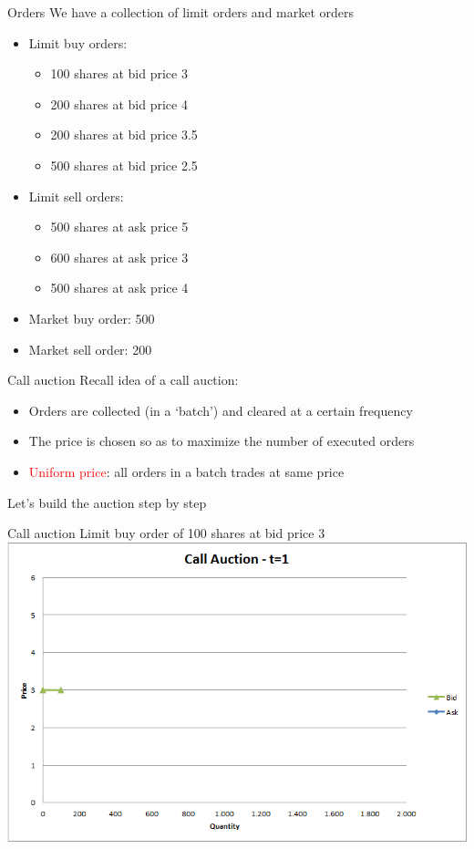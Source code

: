 \begin{frame}{Orders}
	We have a collection of limit orders and market orders
	\begin{itemize}
		\item Limit buy orders:
		\begin{itemize}
			\item 100 shares at bid price 3
			\item 200 shares at bid price 4
			\item 200 shares at bid price 3.5
			\item 500 shares at bid price 2.5
		\end{itemize}
		\item Limit sell orders:
		\begin{itemize}
			\item 500 shares at ask price 5
			\item 600 shares at ask price 3
			\item 500 shares at ask price 4
		\end{itemize}
		\item Market buy order: 500
		\item Market sell order: 200
	\end{itemize}
\end{frame}


\begin{frame}{Call auction}
	Recall idea of a call auction:
	\begin{itemize}
		\item Orders are collected (in a `batch') and cleared at a certain frequency
		\item The price is chosen so as to maximize the number of executed orders
		\item \textcolor{red}{Uniform price}: all orders in a batch trades at same price
	\end{itemize}
	\quad
	Let's build the auction step by step
\end{frame}


\begin{frame}{Call auction}
	Limit buy order of 100 shares at bid price 3
	\quad
	\center
	\includegraphics[width=.75\linewidth]{pics/Call_t1}
\end{frame}


